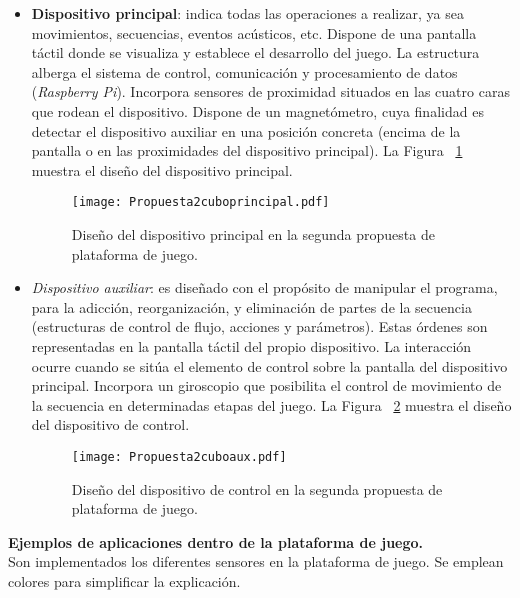 \begin{itemize}
\item \textbf{Dispositivo principal}: indica todas las operaciones a realizar, ya sea movimientos, secuencias, eventos acústicos, etc. Dispone de una pantalla táctil donde se visualiza y establece el desarrollo del juego. La estructura alberga el sistema de control, comunicación y procesamiento de datos (\emph{Raspberry Pi}). Incorpora sensores de proximidad situados en las cuatro caras que rodean el dispositivo. Dispone de un magnetómetro, cuya finalidad es detectar el dispositivo auxiliar en una posición concreta (encima de la pantalla o en las proximidades del dispositivo principal). La Figura ~\ref{fig:Cuboprincipal} muestra el diseño del dispositivo principal.

\begin{figure}[!h]
\begin{center}
\texttt{[image: Propuesta2cuboprincipal.pdf]}
\caption{Diseño del dispositivo principal en la segunda propuesta de plataforma de juego.}
\label{fig:Cuboprincipal}
\end{center}
\end{figure}

\item \emph{Dispositivo auxiliar}: es diseñado con el propósito de manipular el programa, para la adicción, reorganización, y eliminación de partes de la secuencia (estructuras de control de flujo, acciones y parámetros). Estas órdenes son representadas en la pantalla táctil del propio dispositivo. La interacción ocurre cuando se sitúa el elemento de control sobre la pantalla del dispositivo principal. Incorpora un giroscopio que posibilita el control de movimiento de la secuencia en determinadas etapas del juego. La Figura ~\ref{fig:Cuboaux} muestra el diseño del dispositivo de control.

\begin{figure}[!h]
\begin{center}
\texttt{[image: Propuesta2cuboaux.pdf]}
\caption{Diseño del dispositivo de control en la segunda propuesta de plataforma de juego.}
\label{fig:Cuboaux}
\end{center}
\end{figure}
 
\end{itemize}

\textbf{Ejemplos de aplicaciones dentro de la plataforma de juego.}\\
Son implementados los diferentes sensores en la plataforma de juego. Se emplean colores para simplificar la explicación.\\

